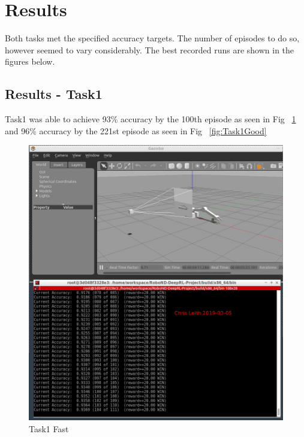 \documentclass[10pt]{article}
\begin{document}
\section{Results}
Both tasks met the specified accuracy targets. The number of episodes to do so, however seemed to vary considerably.
The best recorded runs are shown in the figures below.

\subsection{Results - Task1}
Task1 was able to achieve 93\% accuracy by the 100th episode as seen in Fig ~\ref{fig:Task1Fast} 
and 96\% accuracy by the 221st episode as seen in Fig ~\ref{fig:Task1Good} 

\begin{figure}[p]
      \centering
      \includegraphics[width=\linewidth]{Assets/Task1_90at100_2019-03-05_08-45-06.png}
      \caption{Task1 Fast}
      \label{fig:Task1Fast}
\end{figure}
\end{document}
